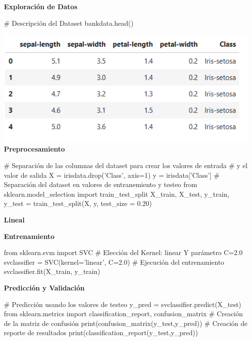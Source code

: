 \documentclass[paper=a4, fontsize=11pt]{scrartcl}
\numberwithin{equation}{section}		%
\numberwithin{figure}{section}			%
\numberwithin{table}{section}				%
\begin{document}
\begin{enumerate}
    \textbf{Exploración de Datos}
    
    \begin{python}
    # Descripción del Dataset
    bankdata.head()
    \end{python}
    
    \includegraphics[scale=0.8]{df2_head}
    \newpage
    \textbf{Preprocesamiento}
    
    \begin{python}
    # Separación de las columnas del dataset para crear los valores de entrada
    # y el valor de salida
    X = irisdata.drop('Class', axis=1)  
    y = irisdata['Class'] 
    # Separación del dataset en valores de entranemiento y testeo
    from sklearn.model_selection import train_test_split  
    X_train, X_test, y_train, y_test = train_test_split(X, y, test_size = 0.20) 
    \end{python}
    
    \textbf{Lineal}
    
    \textbf{Entrenamiento}
    
    \begin{python}
    from sklearn.svm import SVC
    # Elección del Kernel: linear Y parámetro C=2.0
    svclassifier = SVC(kernel='linear', C=2.0)
    # Ejecución del entrenamiento
    svclassifier.fit(X_train, y_train)
    \end{python}
    
    \textbf{Predicción y Validación}
    
    \begin{python}
    # Predicción usando los valores de testeo
    y_pred = svclassifier.predict(X_test)
    from sklearn.metrics import classification_report, confusion_matrix
    # Creación de la matriz de confusión
    print(confusion_matrix(y_test,y_pred))
    # Creación de reporte de resultados
    print(classification_report(y_test,y_pred))
    \end{python}
    

\end{enumerate}
\end{document}

